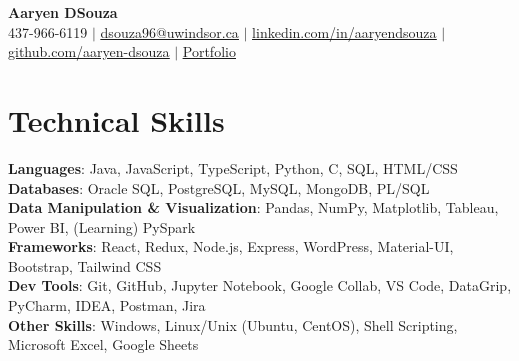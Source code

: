 \documentclass[letterpaper,11pt]{article}
\begin{document}

\begin{center}
    \textbf{\Huge Aaryen DSouza} \\ \vspace{1.5pt}
    \small 437-966-6119 $|$ \href{mailto:dsouza96@uwindsor.ca}{\underline{\phantom{/}dsouza96@uwindsor.ca\phantom{/}}} $|$ 
    \href{https://www.linkedin.com/in/aaryendsouza}{\underline{\phantom{/}linkedin.com/in/aaryendsouza\phantom{/}}} $|$
    \href{https://github.com/aaryen-dsouza}{\underline{\phantom{/}github.com/aaryen-dsouza\phantom{/}}} $|$ 
    \href{https://www.aaryen.vercel.app}{\underline{\phantom{/}Portfolio\phantom{/}}}
\end{center}

\section{Technical Skills}
 \begin{itemize}[leftmargin=0.15in, label={}]
    \small{\item{
     \textbf{Languages}{: Java, JavaScript, TypeScript, Python, C, SQL, HTML/CSS} \\
     \textbf{Databases}{: Oracle SQL, PostgreSQL, MySQL, MongoDB, PL/SQL} \\
     \textbf{Data Manipulation \& Visualization}{: Pandas, NumPy, Matplotlib, Tableau, Power BI, (Learning) PySpark} \\
     \textbf{Frameworks}{: React, Redux, Node.js, Express, WordPress, Material-UI, Bootstrap, Tailwind CSS} \\
     \textbf{Dev Tools}{: Git, GitHub, Jupyter Notebook, Google Collab, VS Code, DataGrip, PyCharm, IDEA, Postman, Jira} \\
     \textbf{Other Skills}{: Windows, Linux/Unix (Ubuntu, CentOS), Shell Scripting, Microsoft Excel, Google Sheets}
    }}
 \end{itemize}


\end{document}
